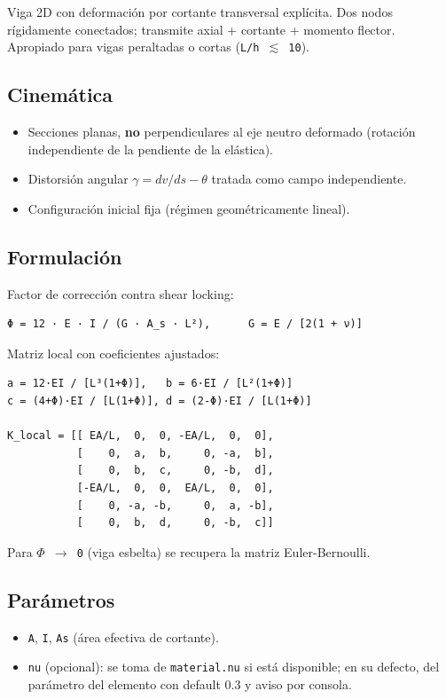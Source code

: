 \documentclass[11pt,letterpaper,oneside]{report}
\begin{document}
Viga 2D con deformación por cortante transversal explícita. Dos nodos rígidamente conectados; transmite axial + cortante + momento flector. Apropiado para vigas peraltadas o cortas (\texttt{L/h \ensuremath{\lesssim} 10}).

\subsection{Cinemática}
\begin{itemize}
  \item Secciones planas, \textbf{no} perpendiculares al eje neutro deformado (rotación independiente de la pendiente de la elástica).
  \item Distorsión angular $\gamma = dv/ds - \theta$ tratada como campo independiente.
  \item Configuración inicial fija (régimen geométricamente lineal).
\end{itemize}

\subsection{Formulación}
Factor de corrección contra shear locking:
\begin{lstlisting}
Φ = 12 · E · I / (G · A_s · L²),      G = E / [2(1 + ν)]

\end{lstlisting}
Matriz local con coeficientes ajustados:
\begin{lstlisting}
a = 12·EI / [L³(1+Φ)],   b = 6·EI / [L²(1+Φ)]
c = (4+Φ)·EI / [L(1+Φ)], d = (2-Φ)·EI / [L(1+Φ)]

K_local = [[ EA/L,  0,  0, -EA/L,  0,  0],
           [    0,  a,  b,     0, -a,  b],
           [    0,  b,  c,     0, -b,  d],
           [-EA/L,  0,  0,  EA/L,  0,  0],
           [    0, -a, -b,     0,  a, -b],
           [    0,  b,  d,     0, -b,  c]]

\end{lstlisting}
Para \texttt{\ensuremath{\Phi} \ensuremath{\to} 0} (viga esbelta) se recupera la matriz Euler-Bernoulli.

\subsection{Parámetros}
\begin{itemize}
  \item \texttt{A}, \texttt{I}, \texttt{As} (área efectiva de cortante).
  \item \texttt{nu} (opcional): se toma de \texttt{material.nu} si está disponible; en su defecto, del parámetro del elemento con default 0.3 y aviso por consola.
\end{itemize}
\end{document}
